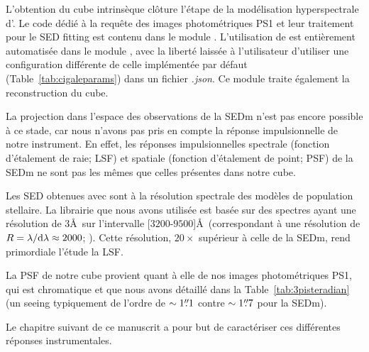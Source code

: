 \documentclass[../main/main.tex]{subfiles}
\begin{document}
L'obtention du cube intrinsèque clôture l'étape de la modélisation hyperspectrale
d'\hypergal. Le code dédié à la requête des images photométriques PS1 et
leur traitement pour le SED fitting est contenu dans le module
. L'utilisation de \cigale est entièrement
automatisée dans le module , avec
la liberté laissée à l'utilisateur d'utiliser une configuration
différente de celle implémentée par défaut
(Table~\ref{tab:cigaleparams}) dans un fichier \textit{.json}. Ce
module traite également la reconstruction du cube.

La projection dans l'espace des observations de la SEDm n'est pas encore
possible à ce stade, car nous n'avons pas pris en compte la réponse
impulsionnelle de notre instrument. En effet, les réponses impulsionnelles spectrale
(fonction d'étalement de raie; LSF) et
spatiale (fonction d'étalement de point; PSF) de la SEDm ne sont pas
les mêmes que celles présentes dans notre cube.

Les SED obtenues avec
\cigale sont à la résolution spectrale des modèles de
population stellaire. La librairie  que nous avons utilisée
est basée sur des spectres ayant une résolution de $3$\AA\ sur
l'intervalle [$3200$-$9500$]\AA\ (correspondant à une résolution de
$R=\lambda/\mathrm{d}\lambda\approx2000$; \citet{BCO3}). Cette résolution,
$20\times$ supérieur à celle de la SEDm, rend primordiale l'étude la
LSF.

La PSF de notre cube provient quant à elle de nos images
photométriques PS1, qui est chromatique et que nous avons détaillé dans
la Table~\ref{tab:3pisteradian} (un seeing typiquement de l'ordre de
$\sim1\overset{\prime\prime}{.}1$ contre $\sim1\overset{\prime\prime}{.}7$ pour la SEDm).

Le chapitre suivant de
ce manuscrit a pour but de caractériser ces différentes réponses
instrumentales.

%
%
\end{document}
